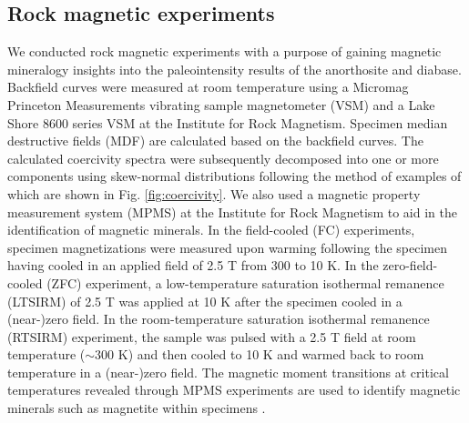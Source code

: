 \documentclass[9pt,twocolumn,twoside,lineno]{pnas-new}
\begin{document}
{%


\subsection*{Rock magnetic experiments}

We conducted rock magnetic experiments with a purpose of gaining magnetic mineralogy insights into the paleointensity results of the anorthosite and diabase. Backfield curves were measured at room temperature using a Micromag Princeton Measurements vibrating sample magnetometer (VSM) and a Lake Shore 8600 series VSM at the Institute for Rock Magnetism. Specimen median destructive fields (MDF) are calculated based on the backfield curves. The calculated coercivity spectra were subsequently decomposed into one or more components using skew-normal distributions following the method of  \citealp{Maxbauer2016a} examples of which are shown in Fig. \ref{fig:coercivity}. We also used a magnetic property measurement system (MPMS) at the Institute for Rock Magnetism to aid in the identification of magnetic minerals. In the field-cooled (FC) experiments, specimen magnetizations were measured upon warming following the specimen having cooled in an applied field of 2.5 T from 300 to 10 K. In the zero-field-cooled (ZFC) experiment, a low-temperature saturation isothermal remanence (LTSIRM) of 2.5 T was applied at 10 K after the specimen cooled in a (near-)zero field. In the room-temperature saturation isothermal remanence (RTSIRM) experiment, the sample was pulsed with a 2.5 T field at room temperature ($\sim$300 K) and then cooled to 10 K and warmed back to room temperature in a (near-)zero field. The magnetic moment transitions at critical temperatures revealed through MPMS experiments are used to identify magnetic minerals such as magnetite within specimens \cite{Feinberg2015a}. 

}
\end{document}
